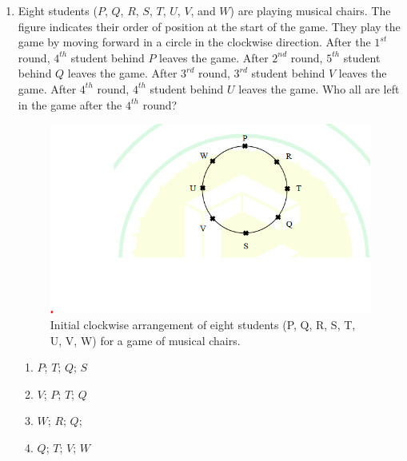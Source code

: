 \documentclass[journal]{IEEEtran}
\begin{document}
\begin{enumerate}
    \item Eight students ($P$, $Q$, $R$, $S$, $T$, $U$, $V$, and $W$) 
are playing musical chairs. The figure indicates their order of position at the start of the game.
They play the game by moving forward in a circle in the clockwise direction.
After the $1^{st}$ round, $4^{th}$ student behind $P$ leaves the game.
After $2^{nd}$ round, $5^{th}$ student behind $Q$ leaves the game. After $3^{rd}$ round, $3^{rd}$ student behind $V$ leaves the game.
After $4^{th}$ round, $4^{th}$ student behind $U$ leaves the game.
Who all are left in the game after the $4^{th}$ round?
\begin{figure}[!h]
        \centering
        \includegraphics[width=0.2\columnwidth]{figs/Q.8.png}
        \caption{Initial clockwise arrangement of eight students (P, Q, R, S, T, U, V, W) for a game of musical chairs.}
        \label{fig:Q.8}
    \end{figure}
    \begin{multicols}{2}
    \begin{enumerate}
        \item $P$;
$T$; $Q$; $S$
        \item $V$; $P$; $T$;
$Q$
        \item $W$; $R$; $Q$;
        \item $Q$; $T$; $V$;
$W$
    \end{enumerate}
    \end{multicols}


\end{enumerate}
\end{document}
